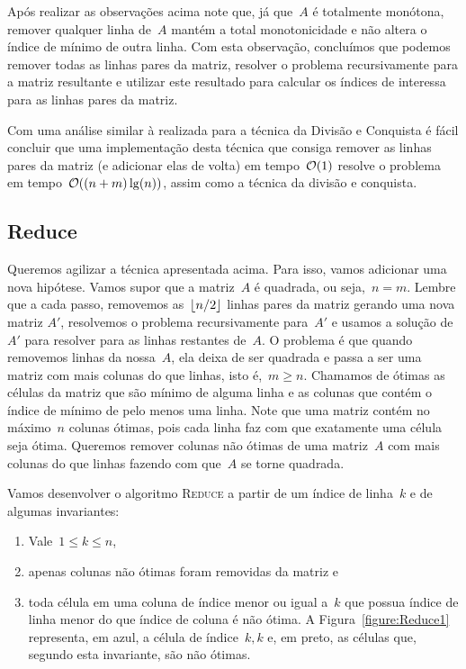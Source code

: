Após realizar as observações acima note que, já que~$A$ é totalmente monótona, remover qualquer linha de~$A$ mantém a total monotonicidade e não altera o índice de mínimo de outra linha. Com esta observação, concluímos que podemos remover todas as linhas pares da matriz, resolver o problema recursivamente para a matriz resultante e utilizar este resultado para calcular os índices de interessa para as linhas pares da matriz.  

Com uma análise similar à realizada para a técnica da Divisão e Conquista é fácil concluir que uma implementação desta técnica que consiga remover as linhas pares da matriz (e adicionar elas de volta) em tempo~$\mathcal{O}(1)$ resolve o problema em tempo~$\mathcal{O}((n+m)\lg(n))$, assim como a técnica da divisão e conquista.  

\subsection{Reduce}
Queremos agilizar a técnica apresentada acima. Para isso, vamos adicionar uma nova hipótese. Vamos supor que a matriz~$A$ é quadrada, ou seja,~$n = m$. Lembre que a cada passo, removemos as~$\lfloor n/2\rfloor$ linhas pares da matriz gerando uma nova matriz $A'$, resolvemos o problema recursivamente para~$A'$ e usamos a solução de~$A'$ para resolver para as linhas restantes de~$A$. O problema é que quando removemos linhas da nossa~$A$, ela deixa de ser quadrada e passa a ser uma matriz com mais colunas do que linhas, isto é,~$m \geq n$. Chamamos de ótimas as células da matriz que são mínimo de alguma linha e as colunas que contém o índice de mínimo de pelo menos uma linha. Note que uma matriz contém no máximo~$n$ colunas ótimas, pois cada linha faz com que exatamente uma célula seja ótima. Queremos remover colunas não ótimas de uma matriz~$A$ com mais colunas do que linhas fazendo com que~$A$ se torne quadrada.  

Vamos desenvolver o algoritmo \textsc{Reduce} a partir de um índice de linha~$k$ e de algumas invariantes: 
\begin{enumerate}
    \item Vale~$1 \leq k \leq n$, \label{invar:Reduce0}
    \item apenas colunas não ótimas foram removidas da matriz e \label{invar:Reduce1}
    \item toda célula em uma coluna de índice menor ou igual a~$k$ que possua índice de linha menor do que índice de coluna é não ótima. A Figura~\ref{figure:Reduce1} representa, em azul, a célula de índice~$k,k$ e, em preto, as células que, segundo esta invariante, são não ótimas. \label{invar:Reduce2}
\end{enumerate}

